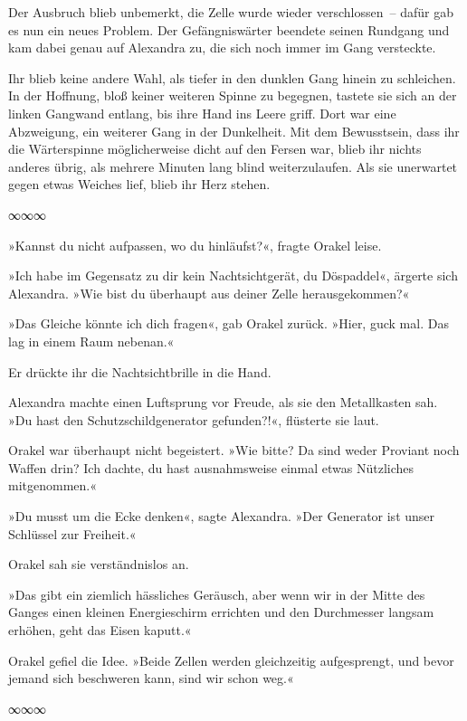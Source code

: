 Der Ausbruch blieb unbemerkt, die Zelle wurde wieder verschlossen~– dafür gab es nun ein neues Problem. Der Gefängniswärter beendete seinen Rundgang und kam dabei genau auf Alexandra zu, die sich noch immer im Gang versteckte.

Ihr blieb keine andere Wahl, als tiefer in den dunklen Gang hinein zu schleichen. In der Hoffnung, bloß keiner weiteren Spinne zu begegnen, tastete sie sich an der linken Gangwand entlang, bis ihre Hand ins Leere griff. Dort war eine Abzweigung, ein weiterer Gang in der Dunkelheit. Mit dem Bewusstsein, dass ihr die Wärterspinne möglicherweise dicht auf den Fersen war, blieb ihr nichts anderes übrig, als mehrere Minuten lang blind weiterzulaufen. Als sie unerwartet gegen etwas Weiches lief, blieb ihr Herz stehen.

\begin{center}
    ∞∞∞
\end{center}

»Kannst du nicht aufpassen, wo du hinläufst?«, fragte Orakel leise.

»Ich habe im Gegensatz zu dir kein Nachtsichtgerät, du Döspaddel«, ärgerte sich Alexandra. »Wie bist du überhaupt aus deiner Zelle herausgekommen?«

»Das Gleiche könnte ich dich fragen«, gab Orakel zurück. »Hier, guck mal. Das lag in einem Raum nebenan.«

Er drückte ihr die Nachtsichtbrille in die Hand.

Alexandra machte einen Luftsprung vor Freude, als sie den Metallkasten sah. »Du hast den Schutzschildgenerator gefunden?!«, flüsterte sie laut.

Orakel war überhaupt nicht begeistert. »Wie bitte? Da sind weder Proviant noch Waffen drin? Ich dachte, du hast ausnahmsweise einmal etwas Nützliches mitgenommen.«

»Du musst um die Ecke denken«, sagte Alexandra. »Der Generator ist unser Schlüssel zur Freiheit.«

Orakel sah sie verständnislos an.

»Das gibt ein ziemlich hässliches Geräusch, aber wenn wir in der Mitte des Ganges einen kleinen Energieschirm errichten und den Durchmesser langsam erhöhen, geht das Eisen kaputt.«

Orakel gefiel die Idee. »Beide Zellen werden gleichzeitig aufgesprengt, und bevor jemand sich beschweren kann, sind wir schon weg.«

\begin{center}
    ∞∞∞
\end{center}

